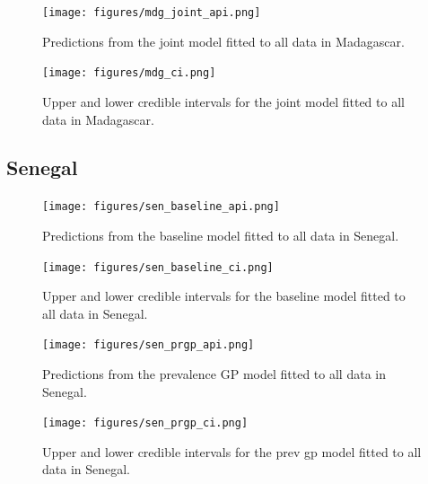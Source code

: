 \documentclass[10pt,a4]{article}
\begin{document}
\begin{figure}[h!]
\centering

\texttt{[image: figures/mdg\_joint\_api.png]}

\caption{Predictions from the joint model fitted to all data in Madagascar.}
\label{jointmdg}
\end{figure}



\begin{figure}[h!]
\centering

\texttt{[image: figures/mdg\_ci.png]}

\caption{Upper and lower credible intervals for the joint model fitted to all data in Madagascar.}
\label{jointmdgci}
\end{figure}




\clearpage

\subsection{Senegal}


\begin{figure}[h!]
\centering

\texttt{[image: figures/sen\_baseline\_api.png]}

\caption{Predictions from the baseline model fitted to all data in Senegal.}
\label{baselinesen}
\end{figure}


\begin{figure}[h!]
\centering

\texttt{[image: figures/sen\_baseline\_ci.png]}

\caption{Upper and lower credible intervals for the baseline model fitted to all data in Senegal.}
\label{basesenci}
\end{figure}





\begin{figure}[h!]
\centering

\texttt{[image: figures/sen\_prgp\_api.png]}

\caption{Predictions from the prevalence GP model fitted to all data in Senegal.}
\label{gpsen}
\end{figure}



\begin{figure}[h!]
\centering

\texttt{[image: figures/sen\_prgp\_ci.png]}

\caption{Upper and lower credible intervals for the prev gp model fitted to all data in Senegal.}
\label{prgpsenci}
\end{figure}
\end{document}
